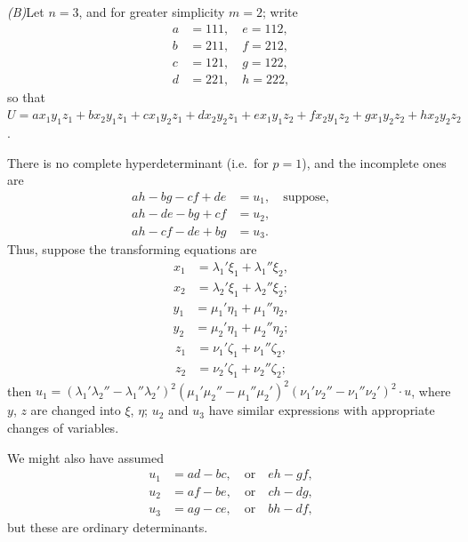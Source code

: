 \documentclass[11pt,a4paper]{book}
\begin{document}
\newpage
\textit{(B)}\quad Let $n=3$, and for greater simplicity $m=2$; write
\begin{align*}
a &= 111, \quad e = 112, \\
b &= 211, \quad f = 212, \\
c &= 121, \quad g = 122, \\
d &= 221, \quad h = 222,
\end{align*}
so that $U = ax_1y_1z_1 + bx_2y_1z_1 + cx_1y_2z_1 + dx_2y_2z_1 + ex_1y_1z_2 + fx_2y_1z_2 + gx_1y_2z_2 + hx_2y_2z_2$.

There is no complete hyperdeterminant (i.e.\ for $p=1$), and the incomplete ones are
\begin{align*}
ah - bg - cf + de &= u_1, \quad \text{suppose}, \\
ah - de - bg + cf &= u_2, \\
ah - cf - de + bg &= u_3.
\end{align*}
Thus, suppose the transforming equations are
\begin{align*}
x_1 &= \lambda_1' \xi_1 + \lambda_1'' \xi_2, \\
x_2 &= \lambda_2' \xi_1 + \lambda_2'' \xi_2;
\end{align*}
\begin{align*}
y_1 &= \mu_1' \eta_1 + \mu_1'' \eta_2, \\
y_2 &= \mu_2' \eta_1 + \mu_2'' \eta_2;
\end{align*}
\begin{align*}
z_1 &= \nu_1' \zeta_1 + \nu_1'' \zeta_2, \\
z_2 &= \nu_2' \zeta_1 + \nu_2'' \zeta_2;
\end{align*}
then $u_1 = (\lambda_1'\lambda_2'' - \lambda_1''\lambda_2')^2 (\mu_1'\mu_2'' - \mu_1''\mu_2')^2 (\nu_1'\nu_2'' - \nu_1''\nu_2')^2 \cdot u$, where $y$, $z$ are changed
into $\xi$, $\eta$; $u_2$ and $u_3$ have similar expressions with appropriate changes of variables.

We might also have assumed
\begin{align*}
u_1 &= ad - bc, \quad \text{or} \quad eh - gf, \\
u_2 &= af - be, \quad \text{or} \quad ch - dg, \\
u_3 &= ag - ce, \quad \text{or} \quad bh - df,
\end{align*}
but these are ordinary determinants.
\end{document}
